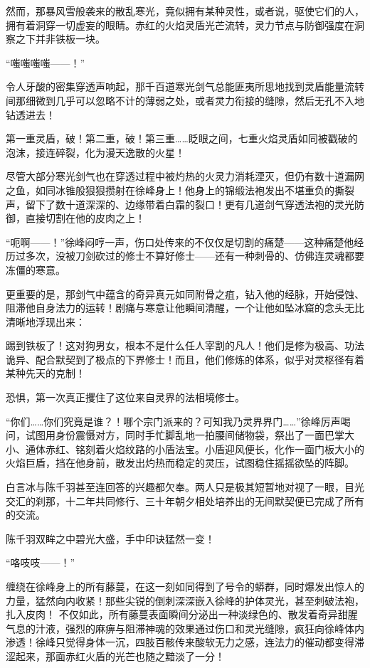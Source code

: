 然而，那暴风雪般袭来的散乱寒光，竟似拥有某种灵性，或者说，驱使它们的人，拥有着洞穿一切虚妄的眼睛。赤红的火焰灵盾光芒流转，灵力节点与防御强度在洞察之下并非铁板一块。

“嗤嗤嗤嗤——！”

令人牙酸的密集穿透声响起，那千百道寒光剑气总能匪夷所思地找到灵盾能量流转间那细微到几乎可以忽略不计的薄弱之处，或者灵力衔接的缝隙，然后无孔不入地钻透进去！

第一重灵盾，破！第二重，破！第三重……眨眼之间，七重火焰灵盾如同被戳破的泡沫，接连碎裂，化为漫天逸散的火星！

尽管大部分寒光剑气也在穿透过程中被灼热的火灵力消耗湮灭，但仍有数十道漏网之鱼，如同冰锥般狠狠攒射在徐峰身上！他身上的锦缎法袍发出不堪重负的撕裂声，留下了数十道深深的、边缘带着白霜的裂口！更有几道剑气穿透法袍的灵光防御，直接切割在他的皮肉之上！

“呃啊——！”徐峰闷哼一声，伤口处传来的不仅仅是切割的痛楚——这种痛楚他经历过多次，没被刀剑砍过的修士不算好修士——还有一种刺骨的、仿佛连灵魂都要冻僵的寒意。

更重要的是，那剑气中蕴含的奇异真元如同附骨之疽，钻入他的经脉，开始侵蚀、阻滞他自身法力的运转！剧痛与寒意让他瞬间清醒，一个让他如坠冰窟的念头无比清晰地浮现出来：

踢到铁板了！这对狗男女，根本不是什么任人宰割的凡人！他们是修为极高、功法诡异、配合默契到了极点的下界修士！而且，他们修炼的体系，似乎对灵枢径有着某种先天的克制！

恐惧，第一次真正攫住了这位来自灵界的法相境修士。

“你们……你们究竟是谁？！哪个宗门派来的？可知我乃灵界界门……”徐峰厉声喝问，试图用身份震慑对方，同时手忙脚乱地一拍腰间储物袋，祭出了一面巴掌大小、通体赤红、铭刻着火焰纹路的小盾法宝。小盾迎风便长，化作一面门板大小的火焰巨盾，挡在他身前，散发出灼热而稳定的灵压，试图稳住摇摇欲坠的阵脚。

白言冰与陈千羽甚至连回答的兴趣都欠奉。两人只是极其短暂地对视了一眼，目光交汇的刹那，十二年共同修行、三十年朝夕相处培养出的无间默契便已完成了所有的交流。

陈千羽双眸之中碧光大盛，手中印诀猛然一变！

“咯吱吱——！”

缠绕在徐峰身上的所有藤蔓，在这一刻如同得到了号令的蟒群，同时爆发出惊人的力量，猛然向内收紧！那些尖锐的倒刺深深嵌入徐峰的护体灵光，甚至刺破法袍，扎入皮肉！ 不仅如此，所有藤蔓表面瞬间分泌出一种淡绿色的、散发着奇异甜腥气息的汁液，强烈的麻痹与阻滞神魂的效果通过伤口和灵光缝隙，疯狂向徐峰体内渗透！徐峰只觉得身体一沉，四肢百骸传来酸软无力之感，连法力的催动都变得滞涩起来，那面赤红火盾的光芒也随之黯淡了一分！

